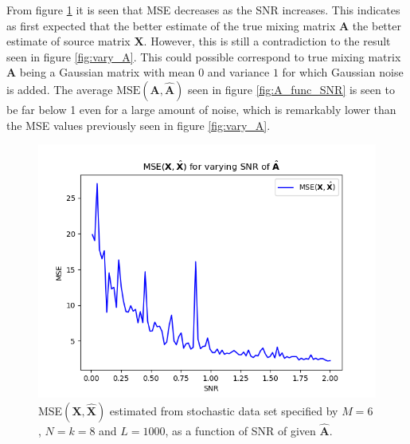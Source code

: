 From figure \ref{fig:X_func_SNR} it is seen that MSE decreases as the SNR increases. 
This indicates as first expected that the better estimate of the true mixing matrix $\mathbf{A}$ the better estimate of source matrix $\mathbf{X}$. 
However, this is still a contradiction to the result seen in figure \ref{fig:vary_A}. 
This could possible correspond to true mixing matrix $\mathbf{A}$ being a Gaussian matrix with mean $0$ and variance $1$ for which Gaussian noise is added. 
The average $\text{MSE}(\mathbf{A}, \hat{\mathbf{A}})$ seen in figure \ref{fig:A_func_SNR} is seen to be far below 1 even for a large amount of noise, which is remarkably lower than the MSE values previously seen in figure \ref{fig:vary_A}.  
\begin{figure}[H]
\begin{widepage}
    \begin{minipage}[t]{.45\textwidth}
    	\centering
		\includegraphics[scale=0.5]{figures/ch_6/X_func_SNR.png}
		\caption{MSE$(\mathbf{X},\hat{\mathbf{X}})$ estimated from stochastic data set specified by $M = 6$, $N = k = 8$ and $L = 1000$, as a function of SNR of given $\hat{\mathbf{A}}$.}
		\label{fig:X_func_SNR}
    \end{minipage} 
    \hspace{0.5cm}
    \begin{minipage}[t]{.45\textwidth}
        \centering

\end{minipage}
\end{widepage}
\end{figure}

